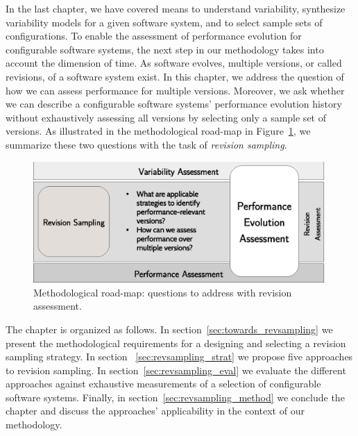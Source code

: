 In the last chapter, we have covered means to understand variability,
synthesize variability models for a given software system, and to select sample
sets of configurations. To enable the assessment of performance evolution for
configurable software systems, the next step in our methodology takes into
account the dimension of time. As software evolves, multiple versions, or
called revisions, of a software system exist. In this chapter, we address the
question of how we can assess performance for multiple versions. Moreover, we
ask whether we can describe a configurable software systems’ performance
evolution history without exhaustively assessing all versions by selecting only
a sample set of versions. As illustrated in the methodological road-map in
Figure~\ref{fig:roadmap_2}, we summarize these two questions with the task of
\emph{revision sampling}.

\begin{figure}[h!]
	\centering
	\includegraphics[width=0.99\textwidth]{images/process_revassesment.eps}
	\caption{Methodological road-map: questions to address with revision
	assessment.}
	\label{fig:roadmap_2}
\end{figure}

The chapter is organized as follows. In section~\ref{sec:towards_revsampling} we
present the methodological requirements for a designing and selecting a revision sampling
strategy. In section ~\ref{sec:revsampling_strat} we propose five approaches to
revision sampling. In
section~\ref{sec:revsampling_eval} we evaluate the different approaches against
exhaustive measurements of a selection of configurable software systems.
Finally, in section~\ref{sec:revsampling_method} we conclude the chapter and
discuss the approaches' applicability in the context of our methodology.

